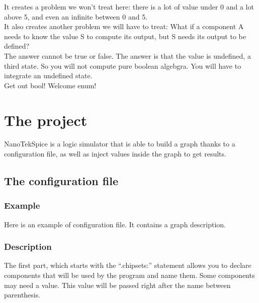 \documentclass{koala-en}
\begin{document}
It creates a problem we won't treat here: there is a lot of value under 0 and
a lot above 5, and even an infinite between 0 and 5.\\

It also creates another problem we will have to treat:
What if a component A needs to know the value S to compute its output, but S
needs its output to be defined?\\

The answer cannot be true or false. The answer is that the value is undefined, a
third state. So you will not compute pure boolean algebgra. You will have to
integrate an undefined state.\\

Get out bool! Welcome enum!

\chapter{The project}

NanoTekSpice is a logic simulator that is able to build a graph thanks to a
configuration file, as well as inject values inside the graph to get results.

\section{The configuration file}

    \subsection{Example}

    Here is an example of configuration file. It contains a graph description.

    

    \subsection{Description}

    The first part, which starts with the ``.chipsets:'' statement allows you
    to declare components that will be used by the program and name them.
    Some components may need a value. This value will be passed right after
    the name between parenthesis.\\
\end{document}
